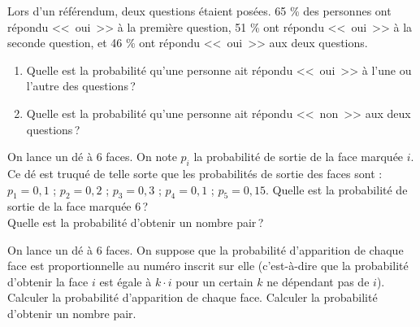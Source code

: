 %
\begin{exo}\label{exo:proba-7}
Lors d’un référendum, deux questions étaient posées.
65 \% des personnes ont répondu <<~oui~>> à la première question, 51 \% ont répondu <<~oui~>> à la seconde question, et 46 \%
ont répondu <<~oui~>> aux deux questions.
\begin{enumerate}
\item Quelle est la probabilité qu’une personne ait répondu <<~oui~>> à l’une ou l’autre des questions\,?
\item Quelle est la probabilité qu’une personne ait répondu <<~non~>> aux deux questions\,?
\end{enumerate}
\end{exo}
%
\begin{exo}\label{exo:proba-8}
On lance un dé à 6 faces. On note $p_i$ la probabilité de sortie de la face marquée $i$. 
Ce dé est truqué de telle sorte que les probabilités de sortie des faces sont :
       $p_1 = 0,1$ ; $p_2 = 0, 2$ ; $p_3 = 0,3$ ; $p_4 = 0,1$ ; $p_5 = 0,15$. \newline
Quelle est la probabilité de sortie de la face marquée 6\,? \\
Quelle est la probabilité d’obtenir un nombre pair\,?
\end{exo}
%
\begin{exo}\label{exo:proba-9}
On lance un dé à 6 faces. 
On suppose que la probabilité d’apparition de chaque face est proportionnelle au numéro inscrit sur elle 
(c'est-\`a-dire que la probabilit\'e d'obtenir la face $i$ est \'egale \`a $k \cdot i$ pour un certain $k$ ne d\'ependant pas de $i$).
Calculer la probabilité d’apparition de chaque face.
Calculer la probabilité d’obtenir un nombre pair.
\end{exo}
%
